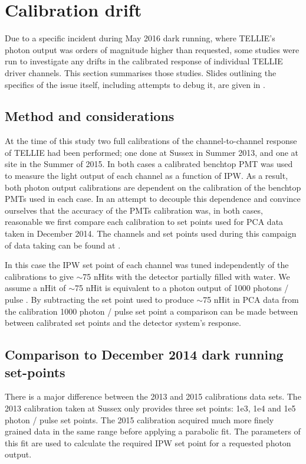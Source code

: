 \documentclass[12pt]{report}
\begin{document}
\section{Calibration drift}
Due to a specific incident during May 2016 dark running, where TELLIE's photon output was orders of magnitude higher than requested, some studies were run to investigate any drifts in the calibrated response of individual TELLIE driver channels. This section summarises those studies. Slides outlining the specifics of the issue itself, including attempts to debug it, are given in \cite{tellieInsensityIssue}. 

\subsection{Method and considerations}
At the time of this study two full calibrations of the channel-to-channel response of TELLIE had been performed; one done at Sussex in Summer 2013, and one at site in the Summer of 2015. In both cases a calibrated benchtop PMT was used to measure the light output of each channel as a function of IPW. As a result, both photon output calibrations are dependent on the calibration of the benchtop PMTs used in each case. In an attempt to decouple this dependence and convince ourselves that the accuracy of the PMTs calibration was, in both cases, reasonable we first compare each calibration to set points used for PCA data taken in December 2014. The channels and set points used during this campaign of data taking can be found at \cite{tellieDataDec2014}. 

In this case the IPW set point of each channel was tuned independently of the calibrations to give $\sim$75 nHits with the detector partially filled with water. We assume a nHit of $\sim$75 nHit is equivalent to a photon output of 1000 photons / pulse \cite{tellieHitProbablities}. By subtracting the set point used to produce $\sim$75 nHit in PCA data from the calibration 1000 photon / pulse set point a comparison can be made between between calibrated set points and the detector system's response.  


\subsection{Comparison to December 2014 dark running set-points}
\label{subsec:calibVsData}
There is a major difference between the 2013 and 2015 calibrations data sets. The 2013 calibration taken at Sussex only provides three set points: 1e3, 1e4 and 1e5 photon / pulse set points. The 2015 calibration acquired much more finely grained data in the same range before applying a parabolic fit. The parameters of this fit are used to calculate the required IPW set point for a requested photon output. 
\end{document}
